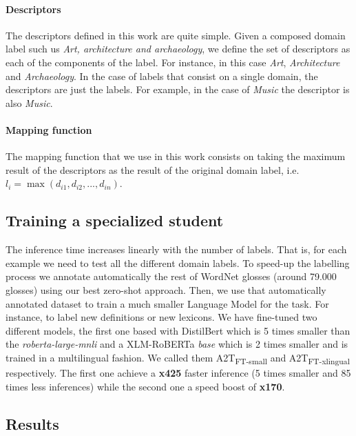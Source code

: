 \documentclass[11pt]{article}
\begin{document}
\paragraph{Descriptors} The descriptors defined in this work are quite simple. Given a composed domain label such us {\it Art, architecture and archaeology}, we define the set of descriptors as each of the components of the label. For instance, in this case {\it Art}, {\it Architecture} and {\it Archaeology}. In the case of labels that consist on a single domain, the descriptors are just the labels. For example, in the case of {\it Music} the descriptor is also {\it Music}.

\paragraph{Mapping function} The mapping function that we use in this work consists on taking the maximum result of the descriptors as the result of the original domain label, i.e. $l_i = \max(d_{i1}, d_{i2}, ..., d_{in})$.

\subsection{Training a specialized student}

The inference time increases linearly with the number of labels. That is, for each example we need to test all the different domain labels. To speed-up the labelling process we annotate automatically the rest of WordNet glosses (around 79.000 glosses) using our best zero-shot approach. Then, we use that automatically annotated dataset to train a much smaller Language Model for the task. For instance, to label new definitions or new lexicons. We have fine-tuned two different models, the first one based with DistilBert \cite{sanh2019distilbert} which is 5 times smaller than the \textit{roberta-large-mnli} and a XLM-RoBERTa \cite{conneau2019unsupervised} \textit{base} which is 2 times smaller and is trained in a multilingual fashion. We called them A2T\textsubscript{FT-small} and A2T\textsubscript{FT-xlingual} respectively. The first one achieve a \textbf{x425} faster inference (5 times smaller and 85 times less inferences) while the second one a speed boost of \textbf{x170}.

\subsection{Results}
\end{document}
